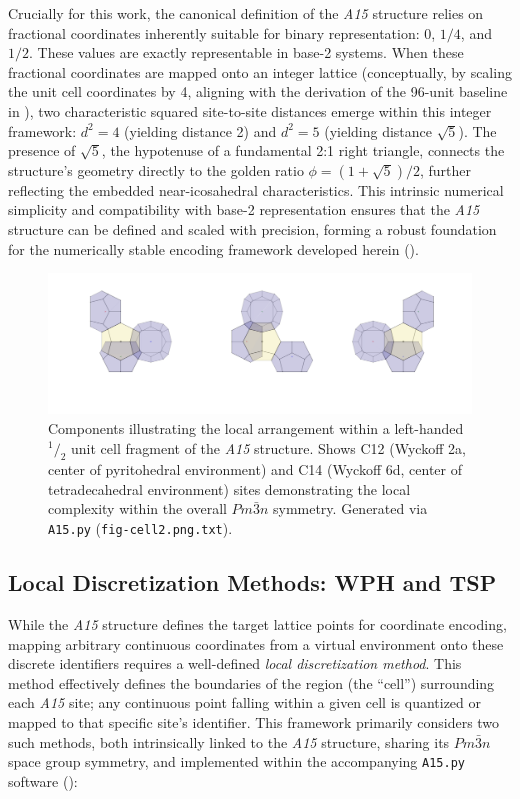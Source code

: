 \documentclass[10pt]{article}
\def\AAAB{\textit{A15}}
\begin{document}
Crucially for this work, the canonical definition of the \AAAB{} structure relies on fractional coordinates inherently suitable for binary representation: $0$, $1/4$, and $1/2$. These values are exactly representable in base-2 systems. When these fractional coordinates are mapped onto an integer lattice (conceptually, by scaling the unit cell coordinates by 4, aligning with the derivation of the 96-unit baseline in ), two characteristic squared site-to-site distances emerge within this integer framework: $d^2 = 4$ (yielding distance 2) and $d^2 = 5$ (yielding distance $\sqrt{5}$). The presence of $\sqrt{5}$, the hypotenuse of a fundamental 2:1 right triangle, connects the structure's geometry directly to the golden ratio $\phi = (1+\sqrt{5})/2$, further reflecting the embedded near-icosahedral characteristics. This intrinsic numerical simplicity and compatibility with base-2 representation ensures that the \AAAB{} structure can be defined and scaled with precision, forming a robust foundation for the numerically stable encoding framework developed herein ().

\begin{figure}[!ht]
    \capstart
    \centering
    \includegraphics[trim={25 50 25 0}, scale=0.55]{fig-cell2}
    \caption{Components illustrating the local arrangement within a left-handed $^1/_2$ unit cell fragment of the \AAAB{} structure. Shows C12 (Wyckoff 2a, center of pyritohedral environment) and C14 (Wyckoff 6d, center of tetradecahedral environment) sites demonstrating the local complexity within the overall $Pm\bar{3}n$ symmetry. Generated via \texttt{A15.py} (\texttt{fig-cell2.png.txt}).}
    \label{fig-cell2}
\end{figure}

\subsection{Local Discretization Methods: WPH and TSP}\label{subsec-intro-partitioning}

While the \AAAB{} structure defines the target lattice points for coordinate encoding, mapping arbitrary continuous coordinates from a virtual environment onto these discrete identifiers requires a well-defined \emph{local discretization method}. This method effectively defines the boundaries of the region (the ``cell'') surrounding each \AAAB{} site; any continuous point falling within a given cell is quantized or mapped to that specific site's identifier. This framework primarily considers two such methods, both intrinsically linked to the \AAAB{} structure, sharing its $Pm\bar{3}n$ space group symmetry, and implemented within the accompanying \texttt{A15.py} software ():
\end{document}
